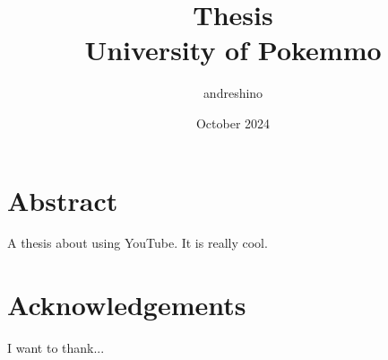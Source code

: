 \documentclass{report}
\title{Thesis\\
{\Large University of Pokemmo}}
\author{andreshino}
\date{October 2024}
\begin{document}
\maketitle
\chapter*{Abstract}
A thesis about using YouTube. It is really cool.
\chapter*{Acknowledgements}
I want to thank...
\tableofcontents
\listoffigures



\appendix



\end{document}
